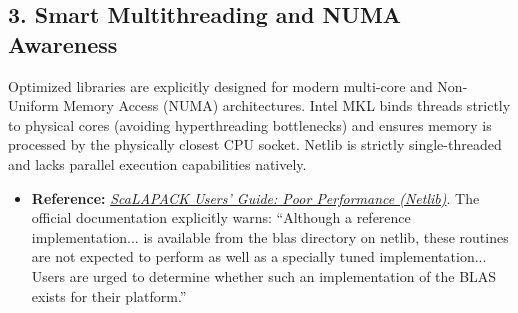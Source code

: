 \documentclass[12pt]{article}
\theoremstyle{definition}
\theoremstyle{remark}
\begin{document}
\subsection*{3. Smart Multithreading and NUMA Awareness}
Optimized libraries are explicitly designed for modern multi-core and Non-Uniform Memory Access (NUMA) architectures. Intel MKL binds threads strictly to physical cores (avoiding hyperthreading bottlenecks) and ensures memory is processed by the physically closest CPU socket. Netlib is strictly single-threaded and lacks parallel execution capabilities natively.
\begin{itemize}[noitemsep, topsep=2pt]
    \item \textbf{Reference:} \href{https://netlib.org/scalapack/slug/node158.html}{\textit{ScaLAPACK Users' Guide: Poor Performance (Netlib)}}. The official documentation explicitly warns: ``Although a reference implementation... is available from the blas directory on netlib, these routines are not expected to perform as well as a specially tuned implementation... Users are urged to determine whether such an implementation of the BLAS exists for their platform.''
\end{itemize}
\end{document}
